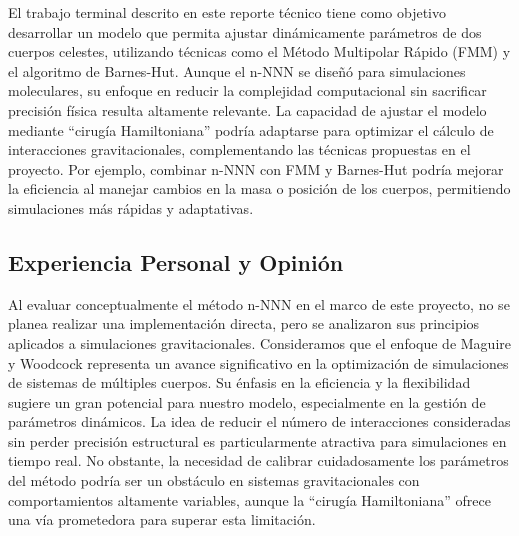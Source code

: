 El trabajo terminal descrito en este reporte técnico tiene como objetivo desarrollar un modelo que permita ajustar dinámicamente parámetros de dos cuerpos celestes, utilizando técnicas como el Método Multipolar Rápido (FMM) y el algoritmo de Barnes-Hut. Aunque el n-NNN se diseñó para simulaciones moleculares, su enfoque en reducir la complejidad computacional sin sacrificar precisión física resulta altamente relevante. La capacidad de ajustar el modelo mediante ``cirugía Hamiltoniana'' podría adaptarse para optimizar el cálculo de interacciones gravitacionales, complementando las técnicas propuestas en el proyecto. Por ejemplo, combinar n-NNN con FMM y Barnes-Hut podría mejorar la eficiencia al manejar cambios en la masa o posición de los cuerpos, permitiendo simulaciones más rápidas y adaptativas.

\subsection{Experiencia Personal y Opinión}

Al evaluar conceptualmente el método n-NNN en el marco de este proyecto, no se planea realizar una implementación directa, pero se analizaron sus principios aplicados a simulaciones gravitacionales. Consideramos que el enfoque de Maguire y Woodcock representa un avance significativo en la optimización de simulaciones de sistemas de múltiples cuerpos. Su énfasis en la eficiencia y la flexibilidad sugiere un gran potencial para nuestro modelo, especialmente en la gestión de parámetros dinámicos. La idea de reducir el número de interacciones consideradas sin perder precisión estructural es particularmente atractiva para simulaciones en tiempo real. No obstante, la necesidad de calibrar cuidadosamente los parámetros del método podría ser un obstáculo en sistemas gravitacionales con comportamientos altamente variables, aunque la ``cirugía Hamiltoniana'' ofrece una vía prometedora para superar esta limitación.